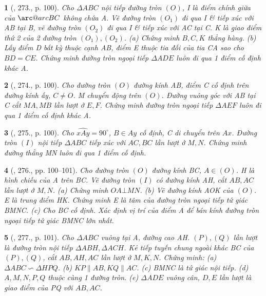 \documentclass{article}
\makeatletter
\newcommand{\arc@char}{{\usefont{U}{tipa}{m}{n}\symbol{62}}}%
\newcommand{\arc}[1]{\mathpalette\arc@arc{#1}}
\newcommand{\arc@arc}[2]{%
	\sbox0{$\m@th#1#2$}%
	\vbox{
		\hbox{\resizebox{\wd0}{\height}{\arc@char}}
		\nointerlineskip
		\box0
	}%
}
\newtheorem{baitoan}{}
\makeatother
\begin{document}
\begin{baitoan}[\cite{Binh_Toan_9_tap_2}, 273., p. 100]
	Cho $\Delta ABC$ nội tiếp đường tròn $(O)$, I là điểm chính giữa của $\arc{BC}$ không chứa A. Vẽ đường tròn $(O_1)$ đi qua I \& tiếp xúc với AB tại B, vẽ đường tròn $(O_2)$ đi qua I \& tiếp xúc với AC tại C. K là giao điểm thứ 2 của 2 đường tròn $(O_1),(O_2)$. (a) Chứng minh $B,C,K$ thẳng hàng. (b) Lấy điểm D bất kỳ thuộc cạnh AB, điểm E thuộc tia đối của tia CA sao cho $BD = CE$. Chứng minh đường tròn ngoại tiếp $\Delta ADE$ luôn đi qua 1 điểm cố định khác A.
\end{baitoan}

\begin{baitoan}[\cite{Binh_Toan_9_tap_2}, 274., p. 100]
	Cho đường tròn $(O)$ đường kính AB, điểm C cố định trên đường kính ấy, $C\ne O$. M chuyển động trên $(O)$. Đường vuông góc với AB tại C cắt $MA,MB$ lần lượt ở $E,F$. Chứng minh đường tròn ngoại tiếp $\Delta AEF$ luôn đi qua 1 điểm cố định khác A.
\end{baitoan}

\begin{baitoan}[\cite{Binh_Toan_9_tap_2}, 275., p. 100]
	Cho $\widehat{xAy} = 90^\circ$, $B\in Ay$ cố định, C di chuyển trên $Ax$. Đường tròn $(I)$ nội tiếp $\Delta ABC$ tiếp xúc với $AC,BC$ lần lượt ở $M,N$. Chứng minh đường thẳng MN luôn đi qua 1 điểm cố định.
\end{baitoan}

\begin{baitoan}[\cite{Binh_Toan_9_tap_2}, 276., pp. 100--101]
	Cho đường tròn $(O)$ đường kính BC, $A\in(O)$. H là hình chiếu của A trên BC. Vẽ đường tròn $(I)$ có đường kính AH, cắt $AB,AC$ lần lượt ở $M,N$. (a) Chứng minh $OA\bot MN$. (b) Vẽ đường kính AOK của $(O)$. E là trung điểm HK. Chứng minh E là tâm của đường tròn ngoại tiếp tứ giác BMNC. (c) Cho BC cố định. Xác định vị trí của điểm A để bán kính đường tròn ngoại tiếp tứ giác BMNC lớn nhất.
\end{baitoan}

\begin{baitoan}[\cite{Binh_Toan_9_tap_2}, 277., p. 101]
	Cho $\Delta ABC$ vuông tại A, đường cao AH. $(P),(Q)$ lần lượt là đường tròn nội tiếp $\Delta ABH,\Delta ACH$. Kẻ tiếp tuyến chung ngoài khác BC của $(P),(Q)$, cắt $AB,AH,AC$ lần lượt ở $M,K,N$. Chứng minh: (a) $\Delta ABC\backsim\Delta HPQ$. (b) $KP\parallel AB,KQ\parallel AC$. (c) BMNC là tứ giác nội tiếp. (d) $A,M,N,P,Q$ thuộc cùng 1 đường tròn. (e) $\Delta ADE$ vuông cân, $D,E$ lần lượt là giao điểm của PQ với $AB,AC$.
\end{baitoan}
\end{document}

